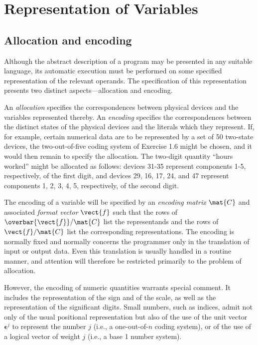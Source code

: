 ﻿
\chapter{Representation of Variables}

\section{Allocation and encoding}

\par Although the abstract description of a program may be presented in any suitable language, its automatic execution must be performed on some specified representation of the relevant operands. The specification of this representation presents two distinct aspects---allocation and encoding.

\par An \textit{allocation} specifies the correspondences between physical devices and the variables represented thereby. An \textit{encoding} specifies the correspondences between the distinct states of the physical devices and the literals which they represent. If, for example, certain numerical data are to be represented by a set of 50 two-state devices, the two-out-of-five coding system of Exercise 1.6 might be chosen, and it would then remain to specify the allocation. The two-digit quantity ``hours worked'' might be allocated as follows: devices 31-35 represent components 1-5, respectively, of the first digit, and devices 29, 16, 17, 24, and 47 represent components 1, 2, 3, 4, 5, respectively, of the second digit.

\par The encoding of a variable will be specified by an \textit{encoding matrix} $\mat{C}$ and associated \textit{format vector} $\vect{f}$ such that the rows of $\overbar{\vect{f}}/\mat{C}$ list the representands and the rows of $\vect{f}/\mat{C}$ list the corresponding representations. The encoding is normally fixed and normally concerns the programmer only in the translation of input or output data. Even this translation is usually handled in a routine manner, and attention will therefore be restricted primarily to the problem of allocation.

\par However, the encoding of numeric quantities warrants special comment. It includes the representation of the sign and of the scale, as well as the representation of the significant digits. Small numbers, such as indices, admit not only of the usual positional representation but also of the use of the unit vector $\textbf{ϵ}^j$ to represent the number $j$ (i.e., a one-out-of-$n$ coding system), or of the use of a logical vector of weight $j$ (i.e., a base 1 number system).

